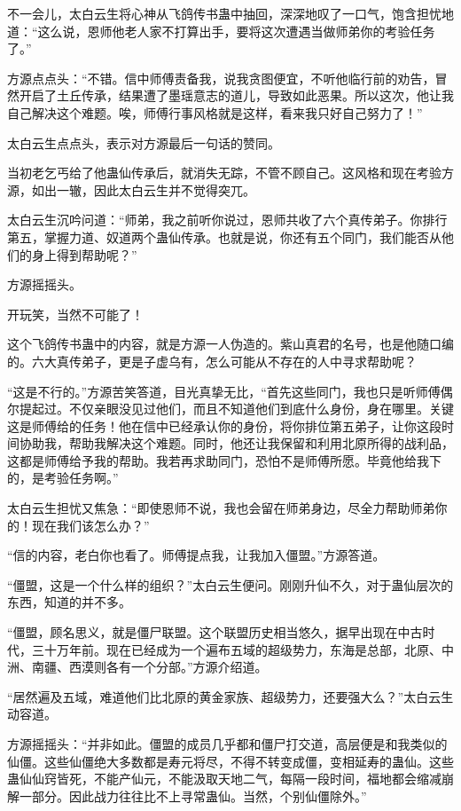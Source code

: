 \begin{this_body}
不一会儿，太白云生将心神从飞鸽传书蛊中抽回，深深地叹了一口气，饱含担忧地道：“这么说，恩师他老人家不打算出手，要将这次遭遇当做师弟你的考验任务了。”

方源点点头：“不错。信中师傅责备我，说我贪图便宜，不听他临行前的劝告，冒然开启了土丘传承，结果遭了墨瑶意志的道儿，导致如此恶果。所以这次，他让我自己解决这个难题。唉，师傅行事风格就是这样，看来我只好自己努力了！”

太白云生点点头，表示对方源最后一句话的赞同。

当初老乞丐给了他蛊仙传承后，就消失无踪，不管不顾自己。这风格和现在考验方源，如出一辙，因此太白云生并不觉得突兀。

太白云生沉吟问道：“师弟，我之前听你说过，恩师共收了六个真传弟子。你排行第五，掌握力道、奴道两个蛊仙传承。也就是说，你还有五个同门，我们能否从他们的身上得到帮助呢？”

方源摇摇头。

开玩笑，当然不可能了！

这个飞鸽传书蛊中的内容，就是方源一人伪造的。紫山真君的名号，也是他随口编的。六大真传弟子，更是子虚乌有，怎么可能从不存在的人中寻求帮助呢？

“这是不行的。”方源苦笑答道，目光真挚无比，“首先这些同门，我也只是听师傅偶尔提起过。不仅亲眼没见过他们，而且不知道他们到底什么身份，身在哪里。关键这是师傅给的任务！他在信中已经承认你的身份，将你排位第五弟子，让你这段时间协助我，帮助我解决这个难题。同时，他还让我保留和利用北原所得的战利品，这都是师傅给予我的帮助。我若再求助同门，恐怕不是师傅所愿。毕竟他给我下的，是考验任务啊。”

太白云生担忧又焦急：“即使恩师不说，我也会留在师弟身边，尽全力帮助师弟你的！现在我们该怎么办？”

“信的内容，老白你也看了。师傅提点我，让我加入僵盟。”方源答道。

“僵盟，这是一个什么样的组织？”太白云生便问。刚刚升仙不久，对于蛊仙层次的东西，知道的并不多。

“僵盟，顾名思义，就是僵尸联盟。这个联盟历史相当悠久，据早出现在中古时代，三十万年前。现在已经成为一个遍布五域的超级势力，东海是总部，北原、中洲、南疆、西漠则各有一个分部。”方源介绍道。

“居然遍及五域，难道他们比北原的黄金家族、超级势力，还要强大么？”太白云生动容道。

方源摇摇头：“并非如此。僵盟的成员几乎都和僵尸打交道，高层便是和我类似的仙僵。这些仙僵绝大多数都是寿元将尽，不得不转变成僵，变相延寿的蛊仙。这些蛊仙仙窍皆死，不能产仙元，不能汲取天地二气，每隔一段时间，福地都会缩减崩解一部分。因此战力往往比不上寻常蛊仙。当然，个别仙僵除外。”


\end{this_body}
